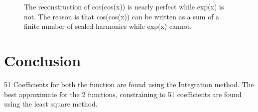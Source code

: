\documentclass[12pt, a4paper]{report}
\begin{document}
\begin{figure}[t]
The reconstruction of cos(cos(x)) is nearly perfect while exp(x) is not. The reason is that cos(cos(x)) can be written as a sum of a finite number of scaled harmonics while exp(x) cannot.
\end{figure}
\section{Conclusion}
51 Coefficients for both the function are found using the Integration method. The best approximate for the 2 functions, constraining to 51 coefficients are found using the least square method.
\end{document}
